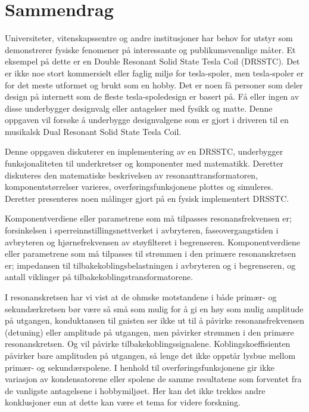 \section*{Sammendrag}
Universiteter, vitenskapssentre og andre institusjoner har behov for utstyr som demonstrerer fysiske fenomener på interessante og publikumsvennlige måter. Et eksempel på dette er en Double Resonant Solid State Tesla Coil (DRSSTC). Det er ikke noe stort kommersielt eller faglig miljø for tesla-spoler, men tesla-spoler er for det meste utformet og brukt som en hobby. Det er noen få personer som deler design på internett som de fleste tesla-spoledesign er basert på. Få eller ingen av disse underbygger designvalg eller antagelser med fysikk og matte. Denne oppgaven vil forsøke å underbygge designvalgene som er gjort i driveren til en musikalsk Dual Resonant Solid State Tesla Coil.

Denne oppgaven diskuterer en implementering av en DRSSTC, underbygger funksjonaliteten til underkretser og komponenter med matematikk. Deretter diskuteres den matematiske beskrivelsen av resonanttransformatoren, komponentstørrelser varieres, overføringsfunksjonene plottes og simuleres. Deretter presenteres noen målinger gjort på en fysisk implementert DRSSTC.

Komponentverdiene eller parametrene som må tilpasses resonansfrekvensen er; forsinkelsen i sperreinnstillingsnettverket i avbryteren, faseovergangstiden i avbryteren og hjørnefrekvensen av støyfilteret i begrenseren. Komponentverdiene eller parametrene som må tilpasses til strømmen i den primære resonanskretsen er; impedansen til tilbakekoblingsbelastningen i avbryteren og i begrenseren, og antall viklinger på tilbakekoblingstransformatorene.

I resonanskretsen har vi vist at de ohmske motstandene i både primær- og sekundærkretsen bør være så små som mulig for å gi en høy som mulig amplitude på utgangen, konduktansen til gnisten ser ikke ut til å påvirke resonansfrekvensen (detuning) eller amplitude på utgangen, men påvirker strømmen i den primære resonanskretsen. Og vil påvirke tilbakekoblingssignalene. Koblingskoeffisienten påvirker bare amplituden på utgangen, så lenge det ikke oppstår lysbue mellom primær- og sekundærspolene. I henhold til overføringsfunksjonene gir ikke variasjon av kondensatorene eller spolene de samme resultatene som forventet fra de vanligste antagelsene i hobbymiljøet. Her kan det ikke trekkes andre konklusjoner enn at dette kan være et tema for videre forskning.